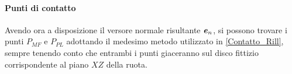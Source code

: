 \paragraph{Punti di contatto}
Avendo ora a disposizione il versore normale risultante $\textbf{\textit{e}}_n$, si possono trovare i punti $P_{MF}$ e $P_{PL}$ adottando il medesimo metodo utilizzato in \ref{Contatto_Rill}, sempre tenendo conto che entrambi i punti giaceranno sul disco fittizio corrispondente al piano $XZ$ della ruota. 